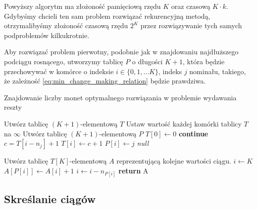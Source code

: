 Powyższy algorytm ma złożoność pamięciową rzędu $K$ oraz czasową $K\cdot k$. 
Gdybyśmy chcieli ten sam problem rozwiązać rekurencyjną metodą, otrzymalibyśmy
złożoność czasową rzędu $2^K$ przez rozwiązywanie tych samych podproblemów kilkukrotnie.

Aby rozwiązać problem pierwotny, podobnie jak w znajdowaniu najdłuższego
podciągu rosnącego, utworzymy tablicę $P$ o długości $K+1$,
która będzie przechowywać w komórce o indeksie $i \in \{0, 1, \ldots K\}$, indeks $j$
nominału, takiego, że zależność \eqref{eq:min_change_making_relation}
będzie prawdziwa.

\begin{algorithm}[H]
	\caption{Znajdowanie liczby monet optymalnego 
		rozwiązania w problemie wydawania reszty}\label{ChangeMaking}
	\begin{algorithmic}[1]
		\State Utwórz tablicę $(K+1)$-elementową $T$
		\State Ustaw wartość każdej komórki tablicy $T$ na $\infty$
		\State Utwórz tablicę $(K+1)$-elementową $P$
		\State $T[0] \gets 0$
		  \textbf{continue}
		\EndIf
		\State $c = T[i - n_j] + 1$
		\State $T[i] \gets c + 1$
		\State $P[i] \gets j$
		\EndIf
		\EndFor
		\EndFor
		 \Return \textit{null}
		\EndIf
		
		\State Utwórz tablicę $T[K]$-elementową $A$ reprezentującą
		kolejne wartości ciągu.
		\State $i \gets K$
		\State $A[P[i]] \gets A[i] + 1$
		\State $i \gets i - n_{P[i]}$
		\EndWhile
		\State \textbf{return} A
		\EndProcedure
	\end{algorithmic}
\end{algorithm}

\subsection{Skreślanie ciągów}
